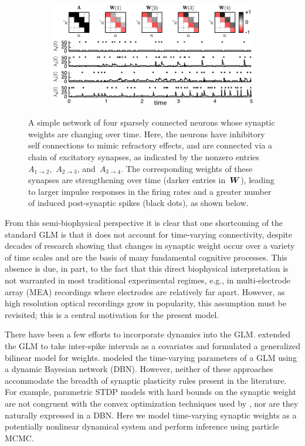 \begin{figure}[t!]
  \centering
  \begin{subfigure}[T]{5.25in}
    \includegraphics[width=\textwidth]{figures/ch4/figure1}    
  \end{subfigure}
  \caption[A simple example of a GLM with time-varying synaptic weights]{
    A simple network of four sparsely connected neurons whose
    synaptic weights are changing over time. Here, the neurons have
    inhibitory self connections to mimic refractory effects, and are
    connected via a chain of excitatory synapses, as indicated by the
    nonzero entries~$A_{1\to 2}$,~$A_{2 \to 3}$, and~$A_{3\to 4}$. The
    corresponding weights of these synapses are strengthening over time
    (darker entries in~$\boldsymbol{W}$), leading to larger impulse responses in
    the firing rates and a greater number of induced post-synaptic
    spikes (black dots), as shown below.}
  \label{fig:model_illustration}
\end{figure}

From this semi-biophysical perspective it is clear that one
shortcoming of the standard GLM is that it does not account for
time-varying connectivity, despite decades of research showing that
changes in synaptic weight occur over a variety of time scales and are
the basis of many fundamental cognitive processes. This absence is
due, in part, to the fact that this direct biophysical interpretation
is not warranted in most traditional experimental regimes, e.g., in
multi-electrode array (MEA) recordings where electrodes are relatively
far apart.  However, as high resolution optical recordings grow in
popularity, this assumption must be revisited; this is a central
motivation for the present model.

There have been a few efforts to incorporate dynamics into the
GLM. \citet{Stevenson-2011} extended the GLM to take inter-spike
intervals as a covariates and formulated a generalized bilinear model
for weights. \citet{Eldawlatly-2010} modeled the time-varying
parameters of a GLM using a dynamic Bayesian network (DBN). However,
neither of these approaches accommodate the breadth of synaptic
plasticity rules present in the literature. For example, parametric
STDP models with hard bounds on the synaptic weight are not congruent
with the convex optimization techniques used by \cite{Stevenson-2011},
nor are they naturally expressed in a DBN. Here we model time-varying
synaptic weights as a potentially nonlinear dynamical system and
perform inference using particle MCMC.

